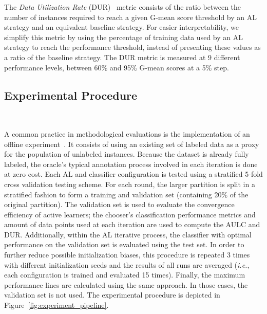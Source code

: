 \documentclass[preprint,12pt]{elsarticle}
\begin{document}
The \textit{Data Utilization Rate} (DUR)~\cite{Reitmaier2013} metric consists
of the ratio between the number of instances required to reach a given G-mean
score threshold by an AL strategy and an equivalent baseline strategy. For
easier interpretability, we simplify this metric by using the percentage
of training data used by an AL strategy to reach the performance threshold,
instead of presenting these values as a ratio of the baseline strategy. The
DUR metric is measured at 9 different performance levels, between
60\% and 95\% G-mean scores at a 5\% step.

\subsection{Experimental Procedure}~\label{sec:experimental_procedure}

A common practice in methodological evaluations is the implementation of an
offline experiment~\cite{Kagy2019}. It consists of using an existing set of
labeled data as a proxy for the population of unlabeled instances. Because the
dataset is already fully labeled, the oracle's typical annotation process
involved in each iteration is done at zero cost. Each AL and classifier
configuration is tested using a stratified 5-fold cross validation testing
scheme. For each round, the larger partition is split in a stratified fashion
to form a training and validation set (containing 20\% of the original
partition). The validation set is used to evaluate the convergence efficiency
of active learners; the chooser's classification performance metrics and
amount of data points used at each iteration are used to compute the AULC and
DUR\@. Additionally, within the AL iterative process, the classifier with
optimal performance on the validation set is evaluated using the test set. In
order to further reduce possible initialization biases, this procedure is
repeated 3 times with different initialization seeds and the results of all
runs are averaged (\textit{i.e.}, each configuration is trained and evaluated
15 times). Finally, the maximum performance lines are calculated using the
same approach. In those cases, the validation set is not used. The
experimental procedure is depicted in Figure~\ref{fig:experiment_pipeline}.
\end{document}
